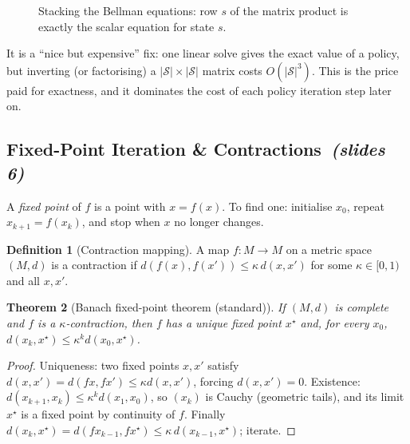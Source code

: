 \documentclass[11pt,a4paper]{article}
\newcommand{\Sset}{\mathcal{S}}
\newcommand{\sltag}[1]{\texorpdfstring{\ \emph{(slides #1)}}{ (slides #1)}}
\theoremstyle{plain}
\newtheorem{theorem}{Theorem}[section]
\theoremstyle{definition}
\newtheorem{definition}[theorem]{Definition}
\theoremstyle{remark}
\begin{document}
\begin{figure}[h]
\centering
{}
\caption{Stacking the Bellman equations: row $s$ of the matrix product is exactly the scalar equation for state $s$.}
\end{figure}

\begin{intuition}
It is a ``nice but expensive'' fix: one linear solve gives the exact value of a policy, but inverting (or factorising) a $|\Sset|\times|\Sset|$ matrix costs $O(|\Sset|^3)$. This is the price paid for exactness, and it dominates the cost of each policy iteration step later on.
\end{intuition}

\subsection{Fixed-Point Iteration \& Contractions\sltag{6}}
A \emph{fixed point} of $f$ is a point with $x=f(x)$. To find one: initialise $x_0$, repeat $x_{k+1}=f(x_k)$, and stop when $x$ no longer changes.

\begin{definition}[Contraction mapping]
A map $f:M\to M$ on a metric space $(M,d)$ is a contraction if $d(f(x),f(x'))\le \kappa\, d(x,x')$ for some $\kappa\in[0,1)$ and all $x,x'$.
\end{definition}

\begin{theorem}[Banach fixed-point theorem (standard)]\label{thm:banach}
If $(M,d)$ is complete and $f$ is a $\kappa$-contraction, then $f$ has a unique fixed point $x^\star$ and, for every $x_0$, $d(x_k,x^\star)\le\kappa^k d(x_0,x^\star)$.
\end{theorem}
\begin{proof}
Uniqueness: two fixed points $x,x'$ satisfy $d(x,x')=d(fx,fx')\le\kappa d(x,x')$, forcing $d(x,x')=0$. Existence: $d(x_{k+1},x_k)\le\kappa^k d(x_1,x_0)$, so $(x_k)$ is Cauchy (geometric tails), and its limit $x^\star$ is a fixed point by continuity of $f$. Finally $d(x_k,x^\star)=d(fx_{k-1},fx^\star)\le\kappa\,d(x_{k-1},x^\star)$; iterate.
\end{proof}
\end{document}
